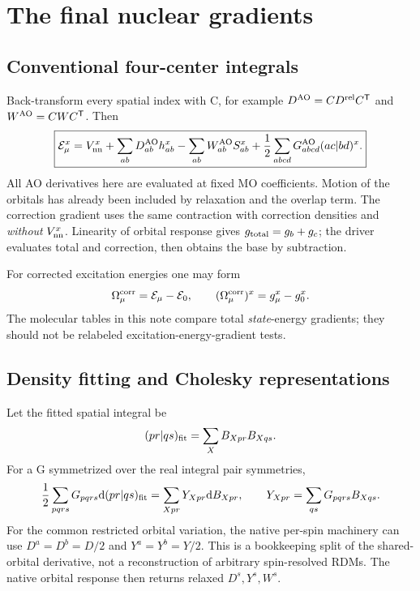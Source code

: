 \documentclass[11pt,letterpaper]{article}
\numberwithin{equation}{section}
\newcommand{\T}{\mathsf T}
\newcommand{\dd}{\mathrm d}
\begin{document}
\section{The final nuclear gradients}
\subsection{Conventional four-center integrals}
Back-transform every spatial index with C, for example
$D^{\rm AO}=CD^{\rm rel}C^{\T}$ and $W^{\rm AO}=CWC^{\T}$. Then
\begin{equation}
 \boxed{\mathcal E_\mu^x=V_{\rm nn}^x+
  \sum_{ab}D^{\rm AO}_{ab}h^x_{ab}
  -\sum_{ab}W^{\rm AO}_{ab}S^x_{ab}
  +\frac12\sum_{abcd}G^{\rm AO}_{abcd}(ac|bd)^x.}
 \label{eq:final4c}
\end{equation}
All AO derivatives here are evaluated at fixed MO coefficients. Motion of
the orbitals has already been included by relaxation and the overlap term.
The correction gradient uses the same contraction with correction densities
and \emph{without} $V_{\rm nn}^x$. Linearity of orbital response gives
$g_{\rm total}=g_b+g_c$; the driver evaluates total and correction, then
obtains the base by subtraction.

For corrected excitation energies one may form
\begin{equation}
 \Omega_\mu^{\rm corr}=\mathcal E_\mu-\mathcal E_0,
 \qquad (\Omega_\mu^{\rm corr})^x=g_\mu^x-g_0^x.
\end{equation}
The molecular tables in this note compare total \emph{state}-energy gradients;
they should not be relabeled excitation-energy-gradient tests.

\subsection{Density fitting and Cholesky representations}
Let the fitted spatial integral be
\begin{equation}
 (pr|qs)_{\rm fit}=\sum_X B_{Xpr}B_{Xqs}.
\end{equation}
For a G symmetrized over the real integral pair symmetries,
\begin{equation}
 \frac12\sum_{pqrs}G_{pqrs}\dd(pr|qs)_{\rm fit}
   =\sum_{Xpr}Y_{Xpr}\dd B_{Xpr},\qquad
 Y_{Xpr}=\sum_{qs}G_{pqrs}B_{Xqs}.
 \label{eq:Ydensity}
\end{equation}
For the common restricted orbital variation, the native per-spin machinery
can use $D^a=D^b=D/2$ and $Y^a=Y^b=Y/2$. This is a bookkeeping split of the
shared-orbital derivative, not a reconstruction of arbitrary spin-resolved
RDMs. The native orbital response then returns relaxed $D^s,Y^s,W^s$.
\end{document}
